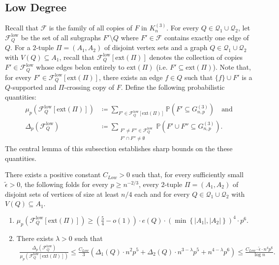 \documentclass[11pt,a4paper,oneside,reqno]{amsart}
\newcommand{\Gnp}{G_{n, p}^{(3)}}
\newcommand{\cF}{\mathcal{F}}
\newcommand{\cQ}{\mathcal{Q}}
\renewcommand{\Pr}{\mathbb{P}}
\newcommand{\1}{\mathbbm{1}} %
\renewcommand{\le}{\leqslant}
\renewcommand{\ge}{\geqslant}
\newcommand{\cFQL}{\cF_Q^{\mathrm{low}}}
\newcommand{\ext}{\mathrm{ext}}
\begin{document}
\subsection{Low Degree}\label{subsection:low degree}
Recall that $\cF$ is the family of all copies of $F$ in $K_n^{(3)}$. For every $Q \in \cQ_1 \cup \cQ_2$, let $\cFQL$ be the set of all subgraphs $F' \setminus Q$ where $F' \in \cF$ contains exactly one edge of $Q$. For a $2$-tuple $\Pi = (A_1, A_2)$ of disjoint vertex sets and a graph $Q \in \cQ_1 \cup \cQ_2$ with $V(Q) \subseteq A_1$, recall that $\cFQL[\ext(\Pi)]$ denotes the collection of copies $F' \in \cFQL$ whose edges belon entirely to $\ext(\Pi)$ (i.e. $F' \subseteq \ext(\Pi)$). Note that, for every $F' \in \cFQL[\ext(\Pi)]$, there exists an edge $f \in Q$ such that $\{f\} \cup F'$ is a $Q$-supported and $\Pi$-crossing copy of $F$. Define the following probabilistic quantities:
\begin{align*}
    \mu_p\left(\cFQL[\ext(\Pi)]\right) &\coloneqq \sum_{F' \in \cFQL\left[\ext(\Pi)\right]} \Pr\left(F' \subseteq \Gnp\right) \quad \text{and}\\
    \Delta_p\left(\cFQL\right) &\coloneqq \sum_{\substack{F' \neq F'' \in \cFQL \\ F' \cap F'' \neq \emptyset}} \Pr\left(F' \cup F'' \subseteq \Gnp\right).
\end{align*}
The central lemma of this subsection establishes sharp bounds on the these quantities.
\begin{lemma}\label{lemma:mu-Delta-bounds-low-degree}
    There exists a positive constant $C_{Low} > 0$ such that, for every sufficiently small $\tilde{\epsilon} > 0$, the following folds for every $p \ge n^{-2/3}$, every $2$-tuple $\Pi = (A_1, A_2)$ of disjoint sets of vertices of size at least $n/4$ each and for every $Q \in \cQ_1 \cup \cQ_2$ with $V(Q) \subseteq A_1$.
    \begin{enumerate}
        \item $\mu_p\left(\cFQL[\ext(\Pi)]\right) \ge \left(\frac{5}{4} - o(1)\right) \cdot e(Q) \cdot \left(\min\left\{|A_1|, |A_2|\right\}\right)^{4} \cdot p^6.$
        \item There exists $\lambda > 0$ such that 
        \begin{align*}
            \frac{\Delta_p\left(\cFQL\right)}{\mu_p\left(\cFQL[\ext(\Pi)]\right)} \le \frac{C_{Low}}{3}\left(\Delta_1(Q) \cdot n^{2} p^{5} + \Delta_2(Q) \cdot n^{3 - \lambda} p^{5} + n^{4 - \lambda} p^{6}\right) \le \frac{C_{Low} \cdot \tilde{\epsilon} \cdot n^4 p^6}{\log n}.
        \end{align*}
    \end{enumerate}
\end{lemma}
\end{document}
